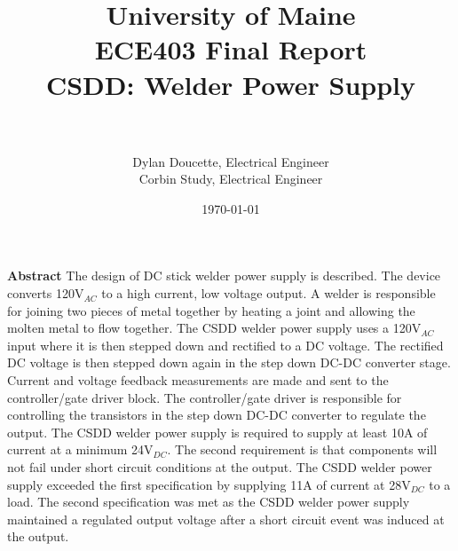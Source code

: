\documentclass[11pt]{article}
\begin{document}


\title{{\huge University of Maine} \\
{\large ECE403 Final Report}\\
\textbf{CSDD: Welder Power Supply\\}\\
     }
\author{Dylan Doucette, Electrical Engineer\\Corbin Study, Electrical Engineer 
  	}
\date{\today}
\maketitle


\newpage %
\textbf{Abstract}
\newline
The design of DC stick welder power supply is described. The device converts 120V$_{AC}$ to a high current, low voltage output. A welder is responsible for joining two pieces of metal together by heating a joint and allowing the molten metal to flow together. The CSDD welder power supply uses a 120V$_{AC}$ input where it is then stepped down and rectified to a DC voltage. The rectified DC voltage is then stepped down again in the step down DC-DC converter stage. Current and voltage feedback measurements are made and sent to the controller/gate driver block. The controller/gate driver is responsible for controlling the transistors in the step down DC-DC converter to regulate the output. The CSDD welder power supply is required to supply at least 10A of current at a minimum 24V$_{DC}$. The second requirement is that components will not fail under short circuit conditions at the output. The CSDD welder power supply exceeded the first specification by supplying 11A of current at 28V$_{DC}$ to a load. The second specification was met as the CSDD welder power supply maintained a regulated output voltage after a short circuit event was induced at the output.

\end{document}
